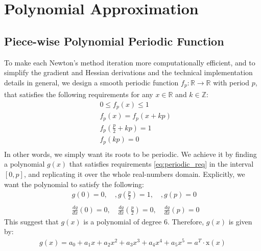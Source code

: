 \chapter{Polynomial Approximation}
\label{appendix:a}
\section{Piece-wise Polynomial Periodic Function}
\label{section:piecewise_periodic_polynomial}
To make each Newton's method iteration more computationally efficient, and to simplify the gradient and Hessian derivations and the technical implementation details in general, we design a smooth periodic function $f_p: \mathbb{R} \xrightarrow[]{} \mathbb{R}$ with period $p$, that satisfies the following requirements for any $x \in \mathbb{R}$ and $k \in \mathbb{Z}$:
\begin{equation}\label{eq:periodic_req}
\begin{split}
&0 \leq f_p\left(x\right) \leq 1 \\
&f_p\left(x\right) = f_p\left(x + kp\right) \\
&f_p\left(\frac{p}{2} + kp\right) = 1 \\
&f_p\left(kp\right) = 0 \\
\end{split}
\end{equation}
In other words, we simply want its roots to be periodic. We achieve it by finding a polynomial $g\left(x\right)$ that satisfies requirements \ref{eq:periodic_req} in the interval $\left[0, p\right]$, and replicating it over the whole real-numbers domain. Explicitly, we want the polynomial to satisfy the following:
\begin{equation}\label{eq:system_of_equations}
\begin{split}
&g\left(0\right) = 0, \quad,
g\left(\frac{p}{2}\right) = 1, \quad,
g\left(p\right) = 0 \\ \\
&\frac{dg}{dx}\left(0\right) = 0, \quad
\frac{dg}{dx}\left(\frac{p}{2}\right) = 0, \quad
\frac{dg}{dx}\left(p\right) = 0
\end{split}
\end{equation}
This suggest that $g\left(x\right)$ is a polynomial of degree 6. Therefore, $g\left(x\right)$ is given by:
\begin{equation}\label{eq:polynomial_6}
\begin{split}
g\left(x\right) = a_0 + a_1x + a_2x^2 + a_3x^3 + a_4x^4 + a_5x^5 = a^T \cdot \mathrm{x}\left(x\right)
\end{split}
\end{equation}
